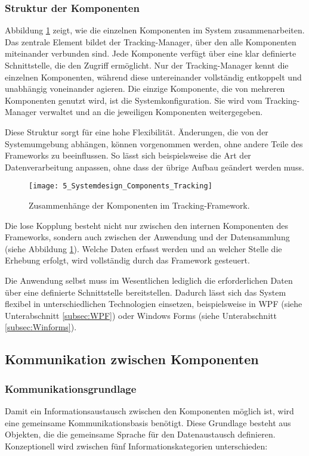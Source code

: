 \subsubsection{Struktur der Komponenten}
Abbildung \ref{fig:system_design_components} zeigt, wie die einzelnen Komponenten im System zusammenarbeiten. Das zentrale Element bildet der {Tracking-Manager}, über den alle Komponenten miteinander verbunden sind. Jede Komponente verfügt über eine klar definierte Schnittstelle, die den Zugriff ermöglicht. Nur der Tracking-Manager kennt die einzelnen Komponenten, während diese untereinander vollständig entkoppelt und unabhängig voneinander agieren. Die einzige Komponente, die von mehreren Komponenten genutzt wird, ist die Systemkonfiguration. Sie wird vom Tracking-Manager verwaltet und an die jeweiligen Komponenten weitergegeben.

Diese Struktur sorgt für eine hohe Flexibilität. Änderungen, die von der Systemumgebung abhängen, können vorgenommen werden, ohne andere Teile des Frameworks zu beeinflussen. So lässt sich beispielsweise die Art der Datenverarbeitung anpassen, ohne dass der übrige Aufbau geändert werden muss.

\begin{figure}[H]
    \centering
    \texttt{[image: 5\_Systemdesign\_Components\_Tracking]}
    \caption{Zusammenhänge der Komponenten im Tracking-Framework.}
    \label{fig:system_design_components}
\end{figure}

Die lose Kopplung besteht nicht nur zwischen den internen Komponenten des Frameworks, sondern auch zwischen der Anwendung und der Datensammlung (siehe Abbildung \ref{fig:system_design_components}). Welche Daten erfasst werden und an welcher Stelle die Erhebung erfolgt, wird vollständig durch das Framework gesteuert.

Die Anwendung selbst muss im Wesentlichen lediglich die erforderlichen Daten über eine definierte Schnittstelle bereitstellen. Dadurch lässt sich das System flexibel in unterschiedlichen Technologien einsetzen, beispielsweise in WPF (siehe Unterabschnitt \ref{subsec:WPF}) oder Windows Forms (siehe Unterabschnitt \ref{subsec:Winforms}).

\subsection{Kommunikation zwischen Komponenten}

\subsubsection{Kommunikationsgrundlage}
Damit ein Informationsaustausch zwischen den Komponenten möglich ist, wird eine gemeinsame Kommunikationsbasis benötigt. Diese Grundlage besteht aus Objekten, die die gemeinsame Sprache für den Datenaustausch definieren.  
Konzeptionell wird zwischen fünf Informationskategorien unterschieden:

